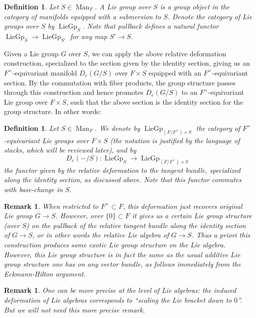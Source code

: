 \documentclass[12pt]{article}
\newtheorem{definition}[theorem]{Definition}
\newtheorem{remark}[theorem]{Remark}
\newcommand{\on}{\operatorname}
\begin{document}
\begin{definition}
Let $S\in\on{Man}_F$.  A \emph{Lie group over $S$} is a group object in the category of manifolds equipped with a submersion to $S$.  Denote the category of Lie groups over $S$ by $\on{LieGp}_{S}$.  Note that pullback defines a natural functor $\on{LieGp}_S\rightarrow \on{LieGp}_{S'}$ for any map $S'\rightarrow S$.
\end{definition}
  Given a Lie group $G$ over $S$, we can apply the above relative deformation construction, specialized to the section given by the identity section, giving us an $F^\times$-equivariant manifold $D_e(G/S)$ over $F\times S$ equipped with an $F^\times$-equivariant section.  By the commutation with fiber products, the group structure passes through this construction and hence promotes $D_e(G/S)$ to an $F^\times$-equivariant Lie group over $F\times S$, such that the above section is the identity section for the group structure.  In other words:

  \begin{definition}\label{deformlie}
Let $S\in\on{Man}_F$.  We denote by $\on{LieGp}_{(F/F^\times)\times S}$ the category of $F^\times$-equivariant Lie groups over $F\times S$ (the notation is justified by the language of stacks, which will be reviewed later), and by
$$D_e(-/S):\on{LieGp}_{S}\rightarrow \on{LieGp}_{(F/F^\times)\times S}$$
the functor given by the relative deformation to the tangent bundle, specialized along the identity section, as discussed above.  Note that this functor commutes with base-change in $S$.
  \end{definition}

  \begin{remark}
  When restricted to $F^\times\subset F$, this deformation just recovers original Lie group $G\rightarrow S$.  However, over $\{0\}\subset F$ it gives us a certain Lie group structure (over $S$) on the pullback of the relative tangent bundle along the identity section of $G\rightarrow S$, or in other words the relative Lie algebra of $G\to S$.  Thus a priori this construction produces some exotic Lie group structure on the Lie algebra.  However, this Lie group structure is in fact the same as the usual additive Lie group structure one has on any vector bundle, as follows immediately from the Eckmann-Hilton argument.

  \end{remark}

  \begin{remark}

  One can be more precise at the level of Lie algebras: the induced deformation of Lie algebras corresponds to ``scaling the Lie bracket down to $0$''.  But we will not need this more precise remark.
\end{remark}
\end{document}
